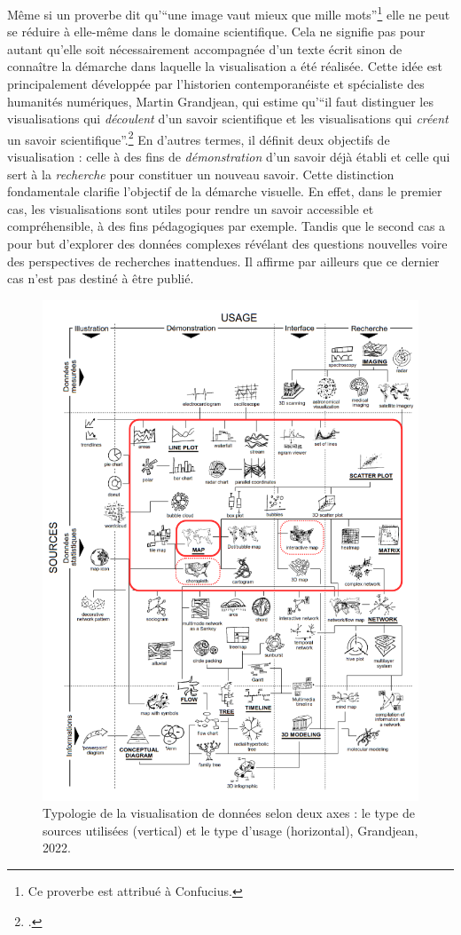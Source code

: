 Même si un proverbe dit qu'\enquote{une image vaut mieux que mille mots}\footnote{Ce proverbe est attribué à Confucius.} elle ne peut se réduire à elle-même dans le domaine scientifique. Cela ne signifie pas pour autant qu'elle soit nécessairement accompagnée d'un texte écrit sinon de connaître la démarche dans laquelle la visualisation a été réalisée. Cette idée est principalement développée par l'historien contemporanéiste et spécialiste des humanités numériques, Martin Grandjean, qui estime qu'\enquote{il faut distinguer les visualisations qui \textit{découlent} d’un savoir scientifique et les visualisations qui \textit{créent} un savoir scientifique}.\footcite{GRANDJEANIntroduction2015} En d'autres termes, il définit deux objectifs de visualisation : celle à des fins de \textit{démonstration} d'un savoir déjà établi et celle qui sert à la \textit{recherche} pour constituer un nouveau savoir. Cette distinction fondamentale clarifie l'objectif de la démarche visuelle. En effet, dans le premier cas, les visualisations sont utiles pour rendre un savoir accessible et compréhensible, à des fins pédagogiques par exemple. Tandis que le second cas a pour but d'explorer des données complexes révélant des questions nouvelles voire des perspectives de recherches inattendues. Il affirme par ailleurs que ce dernier cas n'est pas destiné à être publié. 
\begin{figure}[ht!]
    \centering
    \includegraphics[width=1\linewidth]{images/typologie_dataviz.png}
    \caption{Typologie de la visualisation de données selon deux axes : le type de sources
utilisées (vertical) et le type d’usage (horizontal), Grandjean, 2022.}
    \label{fig:typologie_dataviz}
\end{figure} 

